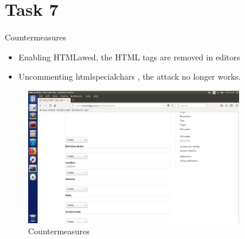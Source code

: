 \documentclass[onecolumn,oneside]{SUSTechHomework}
\begin{document}
  \section*{Task 7}
  Countermeasures

  \begin{itemize}
    \item Enabling HTMLawed, the HTML tags are removed in editors
    \item Uncommenting htmlspecialchars , the attack no longer works.
  \end{itemize}

  \begin{figure}[H]
    \centering
    \includegraphics[width=0.85\textwidth]{img/task7_1.png}
    \caption{Countermeasures} 
  \end{figure}
\end{document}
